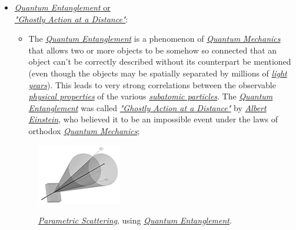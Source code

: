 \documentclass[conference]{IEEEtran}
\begin{document}
\begin{itemize}
  \item \href{https://en.wikipedia.org/wiki/Quantum_entanglement}{\textit{Quantum Entanglement} or \\\textit{"Ghostly Action at a Distance"}}:
   
    \begin{itemize}
        \item The \href{https://en.wikipedia.org/wiki/Quantum_entanglement}{\textit{Quantum Entanglement}} is a phenomenon of \href{https://en.wikipedia.org/wiki/Quantum_mechanics}{\textit{Quantum Mechanics}} that allows two or more objects to be somehow so connected that an object can't be correctly described without its counterpart be mentioned (even though the objects may be spatially separated by millions of \href{https://en.wikipedia.org/wiki/Light-year}{\textit{light years}}). This leads to very strong correlations between the observable \href{https://en.wikipedia.org/wiki/Physical_property}{\textit{physical properties}} of the various \href{https://en.wikipedia.org/wiki/Subatomic_particle}{\textit{subatomic particles}}. The \href{https://en.wikipedia.org/wiki/Quantum_entanglement}{\textit{Quantum Entanglement}} was called \href{https://en.wikipedia.org/wiki/Quantum_entanglement}{\textit{"Ghostly Action at a Distance"}} by \href{https://en.wikipedia.org/wiki/Albert_Einstein}{\textit{Albert Einstein}}, who believed it to be an impossible event under the laws of orthodox \href{https://en.wikipedia.org/wiki/Quantum_mechanics}{\textit{Quantum Mechanics}};
    \end{itemize}
    \begin{center}
      \begin{figure}[htbp]
        \centerline{\href{https://en.wikipedia.org/wiki/Quantum_entanglement}{\includegraphics{imgs/fig-4.png}}}
        \caption{\href{https://en.wikipedia.org/wiki/Spontaneous_parametric_down-conversion}{\textit{Parametric Scattering}}, using \href{https://en.wikipedia.org/wiki/Quantum_entanglement}{\textit{Quantum Entanglement}}.}
        \label{fig}
      \end{figure}
  \end{center}
\end{itemize}
\end{document}
